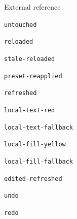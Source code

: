 \documentclass{article}
\begin{document}

\noindent External reference\par
{}
\par\noindent\texttt{untouched}\par


\par\noindent\texttt{reloaded}\par


\par\noindent\texttt{stale-reloaded}\par


\par\noindent\texttt{preset-reapplied}\par


\par\noindent\texttt{refreshed}\par


\par\noindent\texttt{local-text-red}\par


\par\noindent\texttt{local-text-fallback}\par


\par\noindent\texttt{local-fill-yellow}\par


\par\noindent\texttt{local-fill-fallback}\par


\par\noindent\texttt{edited-refreshed}\par


\par\noindent\texttt{undo}\par


\par\noindent\texttt{redo}\par

\end{document}
